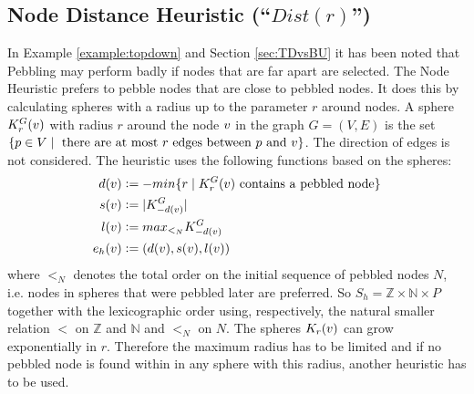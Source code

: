\documentclass{llncs}
\newcommand{\defeq}{\mathrel{\mathop:}=}
\begin{document}
\subsection{Node Distance Heuristic (``$Dist(r)$'')}
\label{sec:distance}

In Example \ref{example:topdown} and Section \ref{sec:TDvsBU} it has been noted that  Pebbling may perform badly if nodes that are far apart are selected. The Node  Heuristic prefers to pebble nodes that are close to pebbled nodes. It does this by calculating spheres with a radius up to the parameter $r$ around nodes.
A sphere $K_r^{G}(v)$ with radius $r$ around the node $v$ in the graph $G = (V,E)$ is the set $\{p \in V \mid \text{ there are at most } r \text{ edges between } p \text{ and } v\}$. The direction of edges is not considered. The heuristic uses the following functions based on the spheres:
\begin{align*}
d(\n) &\defeq -min\{r \mid K_r^{G}(\n)\text{ contains a pebbled node}\}\\
	s(\n) &\defeq |K_{-d(\n)}^G|\\
	l(\n) &\defeq max_{<_N}K_{-d(\n)}^G\\
	e_h(\n) &\defeq (d(\n),s(\n),l(\n))
\end{align*}
where $<_N$ denotes the total order on the initial sequence of pebbled nodes $N$, i.e. nodes in spheres that were pebbled later are preferred.
So $S_h = \mathbb{Z} \times \mathbb{N} \times P$ together with the lexicographic order using, respectively, the natural smaller relation $<$ on $\mathbb{Z}$ and $\mathbb{N}$ and $<_N$ on $N$. The spheres $K_r(v)$ can grow exponentially in $r$. Therefore the maximum radius has to be limited and if no pebbled node is found within in any sphere with this radius, another heuristic has to be used.
\end{document}
